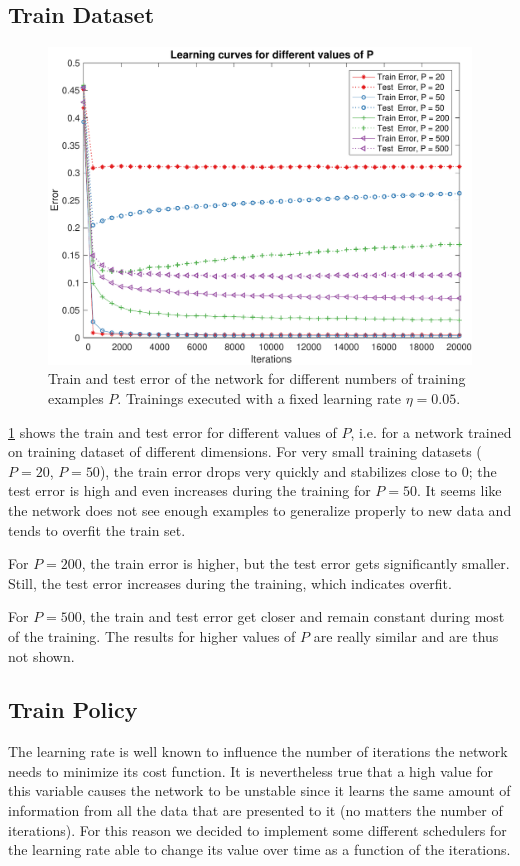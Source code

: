 \subsection{Train Dataset}
\begin{figure}[t]
	\centering
	\includegraphics[width=\columnwidth]{figures/error_ps}
	\caption{Train and test error of the network for different numbers of training examples $P$. Trainings
	executed with a fixed learning rate $\eta = 0.05$.}
	\label{fig:ps}
\end{figure}

\cref{fig:ps} shows the train and test error for different values of $P$, i.e. for a network trained on training dataset of different dimensions.
For very small training datasets ($P = 20$, $P = 50$), the train error drops very quickly and stabilizes close to $0$;
the test error is high and even increases during the training for $P = 50$.
It seems like the network does not see enough examples to generalize properly to new data and tends to overfit the train set.

For $P = 200$, the train error is higher, but the test error gets significantly smaller.
Still, the test error increases during the training, which indicates overfit.

For $P = 500$, the train and test error get closer and remain constant during most of the training.
The results for higher values of $P$ are really similar and are thus not shown.

\subsection{Train Policy}
The learning rate is well known to influence the number of iterations the network needs to minimize
its cost function. It is nevertheless true that a high value for this variable causes the network to
be unstable since it learns the same amount of information from all the data that are presented to it (no matters the number of iterations).
For this reason we decided to implement some different schedulers for the learning rate able to change its
value over time as a function of the iterations.

